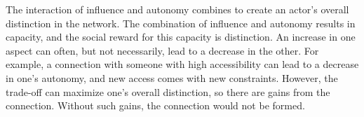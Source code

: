 \documentclass[12pt]{article}
\begin{document}
The interaction of influence and autonomy combines to create an actor’s overall distinction in the network. The combination of influence and autonomy results in capacity, and the social reward for this capacity is distinction. An increase in one aspect can often, but not necessarily, lead to a decrease in the other. For example, a connection with someone with high accessibility can lead to a decrease in one’s autonomy, and new access comes with new constraints. However, the trade-off can maximize one’s overall distinction, so there are gains from the connection. Without such gains, the connection would not be formed.







\newpage


\newpage


\end{document}

